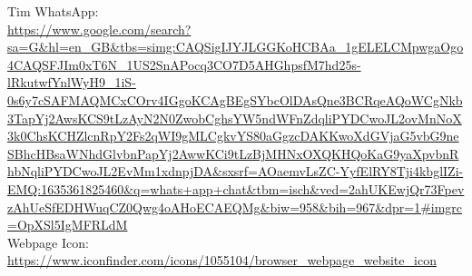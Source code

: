 Tim WhatsApp:\\
\url{https://www.google.com/search?sa=G&hl=en_GB&tbs=simg:CAQSigIJYJLGGKoHCBAa_1gELELCMpwgaOgo4CAQSFJIm0xT6N_1US2SnAPocq3CO7D5AHGhpsfM7hd25s-lRkutwfYnlWyH9_1iS-0s6y7cSAFMAQMCxCOrv4IGgoKCAgBEgSYbcOlDAsQne3BCRqeAQoWCgNkb3TapYj2AwsKCS9tLzAyN2N0ZwobCghsYW5ndWFnZdqliPYDCwoJL2ovMnNoX3k0ChsKCHZlcnRpY2Fs2qWI9gMLCgkvYS80aGgzcDAKKwoXdGVjaG5vbG9neSBhcHBsaWNhdGlvbnPapYj2AwwKCi9tLzBjMHNxOXQKHQoKaG9yaXpvbnRhbNqliPYDCwoJL2EvMm1xdnpjDA&sxsrf=AOaemvLsZC-YyfElRY8Tji4kbglIZi-EMQ:1635361825460&q=whats+app+chat&tbm=isch&ved=2ahUKEwjQr73FpevzAhUeSfEDHWuqCZ0Qwg4oAHoECAEQMg&biw=958&bih=967&dpr=1#imgrc=OpXSl5IgMFRLdM}\\

Webpage Icon:\\
\url{https://www.iconfinder.com/icons/1055104/browser_webpage_website_icon}\\










